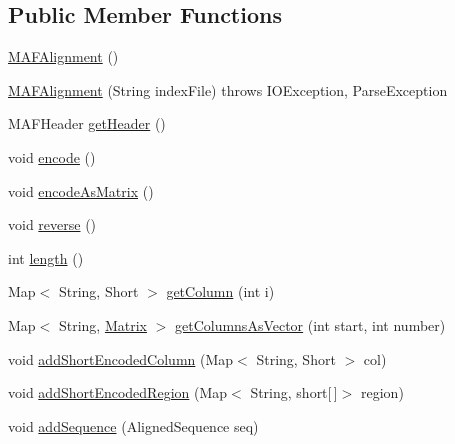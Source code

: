 \subsection*{Public Member Functions}
\begin{DoxyCompactItemize}
\item 
\hyperlink{classbroad_1_1core_1_1multiplealignment_1_1_m_a_f_alignment_a226c288c376c8b47482d6ba6b60312a0}{M\+A\+F\+Alignment} ()
\item 
\hyperlink{classbroad_1_1core_1_1multiplealignment_1_1_m_a_f_alignment_ae9e4f443b0913d3adf0c2fbcc5a13840}{M\+A\+F\+Alignment} (String index\+File)  throws I\+O\+Exception, Parse\+Exception 
\item 
M\+A\+F\+Header \hyperlink{classbroad_1_1core_1_1multiplealignment_1_1_m_a_f_alignment_a2b163056c476a4b7ddf520d28a0dd68b}{get\+Header} ()
\item 
void \hyperlink{classbroad_1_1core_1_1multiplealignment_1_1_m_a_f_alignment_a236987e06bfbaaae7dcfda68bcbaf263}{encode} ()
\item 
void \hyperlink{classbroad_1_1core_1_1multiplealignment_1_1_m_a_f_alignment_afe5c9258a32f8a9fa8f4e425bfd4a7dd}{encode\+As\+Matrix} ()
\item 
void \hyperlink{classbroad_1_1core_1_1multiplealignment_1_1_m_a_f_alignment_a49860e2e33fada19f96d79e80f83846d}{reverse} ()
\item 
int \hyperlink{classbroad_1_1core_1_1multiplealignment_1_1_m_a_f_alignment_ae6ece40cdb07082d25bcb0169cb86063}{length} ()
\item 
Map$<$ String, Short $>$ \hyperlink{classbroad_1_1core_1_1multiplealignment_1_1_m_a_f_alignment_a5c0ddfc79c6d95bc1579f156f84f5608}{get\+Column} (int i)
\item 
Map$<$ String, \hyperlink{class_jama_1_1_matrix}{Matrix} $>$ \hyperlink{classbroad_1_1core_1_1multiplealignment_1_1_m_a_f_alignment_a4a26c761129c3b99364a45c242f8e06b}{get\+Columns\+As\+Vector} (int start, int number)
\item 
void \hyperlink{classbroad_1_1core_1_1multiplealignment_1_1_m_a_f_alignment_a09ef41af5f0a547c0cf02d0074fdfd95}{add\+Short\+Encoded\+Column} (Map$<$ String, Short $>$ col)
\item 
void \hyperlink{classbroad_1_1core_1_1multiplealignment_1_1_m_a_f_alignment_ac91ab1064095b29236c4b3a41483f5fc}{add\+Short\+Encoded\+Region} (Map$<$ String, short\mbox{[}$\,$\mbox{]}$>$ region)
\item 
void \hyperlink{classbroad_1_1core_1_1multiplealignment_1_1_m_a_f_alignment_a192a50fae0bf453d36f2a3dbf00eead1}{add\+Sequence} (Aligned\+Sequence seq)

\end{DoxyCompactItemize}
